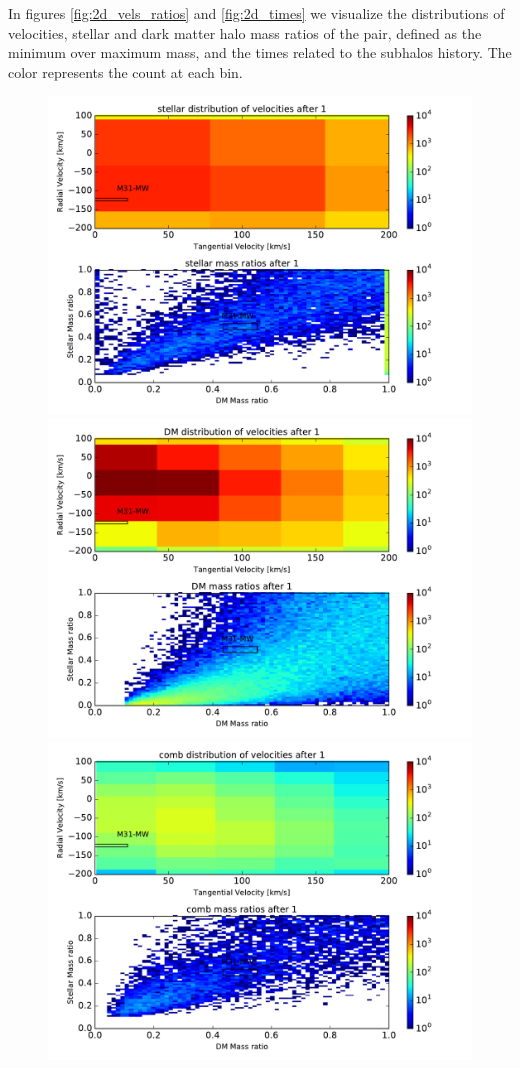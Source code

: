 \documentclass[fleqn,usenatbib]{mnras}
\begin{document}
In figures \ref{fig:2d_vels_ratios} and \ref{fig:2d_times} we visualize the distributions of velocities, stellar and dark matter halo mass ratios of the pair, defined as the minimum over maximum mass, and the times related to the subhalos history. The color represents the count at each bin. 
\begin{figure}
\centering
\includegraphics[scale=0.27]{avgProp/stellar_2Dhists_1.pdf}
\includegraphics[scale=0.27]{avgProp/DM_2Dhists_1.pdf}
\includegraphics[scale=0.27]{avgProp/comb_2Dhists_1.pdf}

\end{figure}
\end{document}
